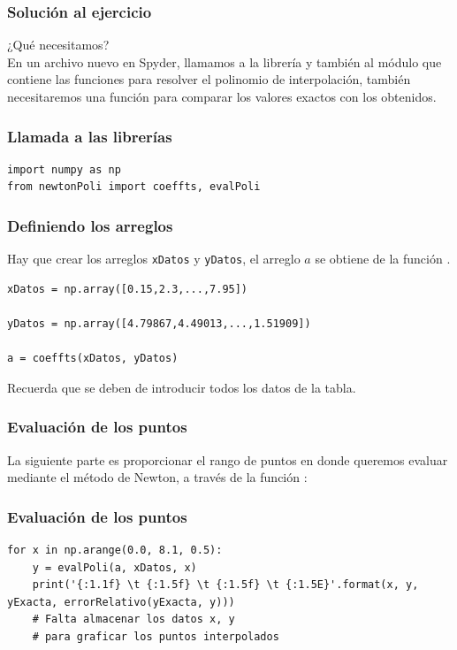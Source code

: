 \documentclass[12pt]{beamer}
\begin{document}
\begin{frame}[fragile]
\frametitle{Solución al ejercicio}
¿Qué necesitamos?
\\
\medskip
\pause
En un archivo nuevo en Spyder, llamamos a la librería  y también al módulo  que contiene las funciones para resolver el polinomio de interpolación, también necesitaremos una función  para comparar los valores exactos con los obtenidos.
\end{frame}
\begin{frame}[fragile]
\frametitle{Llamada a las librerías}
\begin{lstlisting}[caption=Llamando a las librerías y módulos, style=FormattedNumber, basicstyle=\linespread{1.1}\ttfamily=\small, columns=fullflexible]
import numpy as np
from newtonPoli import coeffts, evalPoli
\end{lstlisting}
\end{frame}
\begin{frame}[fragile]
\frametitle{Definiendo los arreglos}
Hay que crear los arreglos \texttt{xDatos} y \texttt{yDatos}, el arreglo $a$ se obtiene de la función .
\pause
\begin{lstlisting}[caption=Arreglos de la tabla, style=FormattedNumber, basicstyle=\linespread{0.9}\ttfamily=\small, columns=fullflexible]
xDatos = np.array([0.15,2.3,...,7.95])

yDatos = np.array([4.79867,4.49013,...,1.51909])

a = coeffts(xDatos, yDatos)
\end{lstlisting}
Recuerda que se deben de introducir todos los datos de la tabla.
\end{frame}
\begin{frame}[fragile]
\frametitle{Evaluación de los puntos}
La siguiente parte es proporcionar el rango de puntos en donde queremos evaluar mediante el método de Newton, a través de la función :
\end{frame}
\begin{frame}[fragile]
\frametitle{Evaluación de los puntos}
\begin{lstlisting}[caption=Evaluando los puntos y el error relativo, style=FormattedNumber, basicstyle=\linespread{1.1}\ttfamily=\small, columns=fullflexible]
for x in np.arange(0.0, 8.1, 0.5):
    y = evalPoli(a, xDatos, x)
    print('{:1.1f} \t {:1.5f} \t {:1.5f} \t {:1.5E}'.format(x, y, yExacta, errorRelativo(yExacta, y)))
    # Falta almacenar los datos x, y 
    # para graficar los puntos interpolados
\end{lstlisting}
\end{frame}
\end{document}
